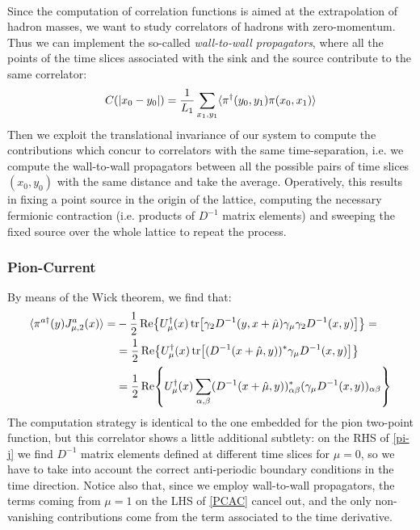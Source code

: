 \\ Since the computation of correlation functions is aimed at the extrapolation of hadron masses, we want to study correlators of hadrons with zero-momentum. %
Thus we can implement the so-called \textit{wall-to-wall propagators}, where all the points of the time slices associated with the sink and the source contribute to the same correlator:
\begin{equation}\label{C(x0 - y0)}
    C(\abs{x_0 - y_0}) = \frac{1}{L_1} \sum_{x_1, y_1} \langle \pi^\dagger(y_0, y_1) \pi(x_0, x_1) \rangle
\end{equation}
Then we exploit the translational invariance of our system to compute the contributions which concur to correlators with the same time-separation, i.e. we compute the wall-to-wall propagators between all the possible pairs of time slices $(x_0, y_0)$ with the same distance and take the average.
Operatively, this results in fixing a point source in the origin of the lattice, computing the necessary fermionic contraction (i.e. products of $D^{-1}$ matrix elements) and sweeping the fixed source over the whole lattice to repeat the process.


\subsubsection*{Pion-Current}
By means of the Wick theorem, we find that:
\begin{equation}\label{pi-j}
   \begin{split}
     \langle \pi^{a\dagger}(y) J^{a}_{\mu,2}(x) \rangle = & - \frac{1}{2} \Re{U^\dagger_\mu(x) \tr[\gamma_2 D^{-1}(y, x + \hat{\mu}) \gamma_\mu \gamma_2 D^{-1}(x, y)]} = \\
     & = \frac{1}{2} \Re{U^\dagger_\mu(x) \tr[(D^{-1}(x + \hat{\mu}, y))^* \gamma_\mu D^{-1}(x, y)]}
     \\ & = \frac{1}{2} \Re{U^\dagger_\mu(x) \sum_{\alpha, \beta} (D^{-1}(x + \hat{\mu}, y))^*_{\alpha \beta} (\gamma_\mu D^{-1}(x, y))_{\alpha \beta}}
\end{split} 
\end{equation}
The computation strategy is identical to the one embedded for the pion two-point function, but this correlator shows a little additional subtlety: on the RHS of \eqref{pi-j} we find $D^{-1}$ matrix elements defined at different time slices for $\mu = 0$, so we have to take into account the correct anti-periodic boundary conditions in the time direction. Notice also that, since we employ wall-to-wall propagators, the terms coming from $\mu = 1$ on the LHS of \eqref{PCAC} cancel out, and the only non-vanishing contributions come from the term associated to the time derivative.

